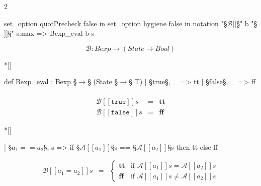 \begin{paracol}{2}
\begin{leftcolumn}
    \begin{Lean_Code}
set_option quotPrecheck
  false in
set_option hygiene false in
notation "§\color{purple}\(\mathcal{B}[\![\)§" b "§\color{purple}\(]\!]\)§" s:max =>
  Bexp_eval b s
    \end{Lean_Code}
\end{leftcolumn}
\begin{rightcolumn}
    \[
    \mathcal{B} : Bexp \to (State \to Bool)
    \]
\end{rightcolumn}

\switchcolumn[1]*[]
\begin{leftcolumn}
    \begin{Lean_Code}
def Bexp_eval : Bexp §\(\to\)§
  (State §\(\to\)§ T)
  | §true§, _ => tt
  | §false§, _ => ff
    \end{Lean_Code}
\end{leftcolumn}
\begin{rightcolumn}
    \[
    \begin{array}{rcl}
    \\[1.8em]
    \mathcal{B}[\![\mathtt{true}]\!]s &=& \textbf{tt} \\
    \mathcal{B}[\![\mathtt{false}]\!]s &=& \textbf{ff}
    \end{array}
    \]
\end{rightcolumn}

\switchcolumn[1]*[]
\begin{leftcolumn}
    \begin{Lean_Code}
  | §\(a_1 == a_2\)§, s =>
    if  §\(\mathcal{A}[\![a_1]\!]\)§s == §\(\mathcal{A}[\![a_2]\!]\)§s then tt
    else ff
    \end{Lean_Code}
\end{leftcolumn}
\begin{rightcolumn}
    \[
    \begin{array}{rcl}
    \mathcal{B}[\![a_1 = a_2]\!]s &=& \begin{cases} 
        \textbf{tt} & \text{if } \mathcal{A}[\![a_1]\!]s = \mathcal{A}[\![a_2]\!]s \\ 
        \textbf{ff} & \text{if } \mathcal{A}[\![a_1]\!]s \neq \mathcal{A}[\![a_2]\!]s
        \end{cases}
    \end{array}
    \]
\end{rightcolumn}


\end{paracol}
